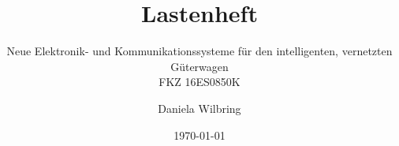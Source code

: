 \documentclass[11pt,a4paper,parskip]{scrartcl}
\author{Daniela Wilbring}
\title{Lastenheft}
\subtitle{Neue Elektronik- und Kommunikationssysteme für den intelligenten, vernetzten Güterwagen\\FKZ 16ES0850K}
\date{\today}
\begin{document}
\maketitle \newpage
\tableofcontents \newpage
\\

%
\appendix


\end{document}
